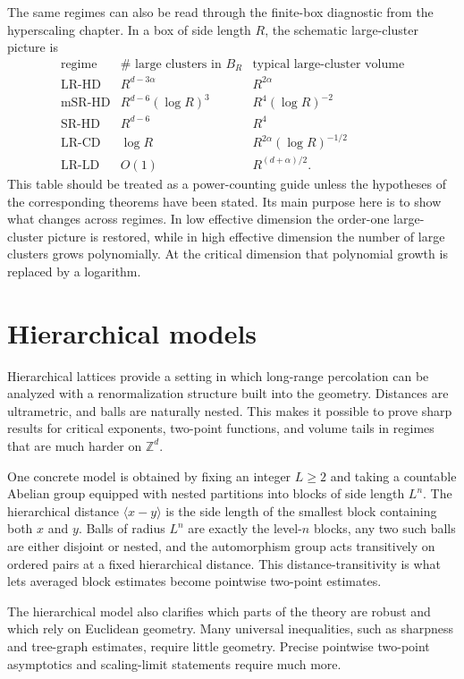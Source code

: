 \documentclass[11pt,reqno]{book}
\numberwithin{equation}{chapter}
\theoremstyle{plain}
\theoremstyle{definition}
\theoremstyle{remark}
\newcommand{\Z}{\mathbb Z}
\newcommand{\1}{\mathbf 1}
\begin{document}
The same regimes can also be read through the finite-box diagnostic from the hyperscaling chapter. In a box of side length $R$, the schematic large-cluster picture is
\[
\begin{array}{c|c|c}
\text{regime}
&
\#\text{ large clusters in }B_R
&
\text{typical large-cluster volume}
\\ \hline
\mathrm{LR\mbox{-}HD}
&
R^{d-3\alpha}
&
R^{2\alpha}
\\
\mathrm{mSR\mbox{-}HD}
&
R^{d-6}(\log R)^3
&
R^4(\log R)^{-2}
\\
\mathrm{SR\mbox{-}HD}
&
R^{d-6}
&
R^4
\\
\mathrm{LR\mbox{-}CD}
&
\log R
&
R^{2\alpha}(\log R)^{-1/2}
\\
\mathrm{LR\mbox{-}LD}
&
O(1)
&
R^{(d+\alpha)/2}.
\end{array}
\]
This table should be treated as a power-counting guide unless the hypotheses of the corresponding theorems have been stated. Its main purpose here is to show what changes across regimes. In low effective dimension the order-one large-cluster picture is restored, while in high effective dimension the number of large clusters grows polynomially. At the critical dimension that polynomial growth is replaced by a logarithm.

\section{Hierarchical models}

Hierarchical lattices provide a setting in which long-range percolation can be analyzed with a renormalization structure built into the geometry. Distances are ultrametric, and balls are naturally nested. This makes it possible to prove sharp results for critical exponents, two-point functions, and volume tails in regimes that are much harder on $\Z^d$.

One concrete model is obtained by fixing an integer $L\geq2$ and taking a countable Abelian group equipped with nested partitions into blocks of side length $L^n$. The hierarchical distance $\langle x-y\rangle$ is the side length of the smallest block containing both $x$ and $y$. Balls of radius $L^n$ are exactly the level-$n$ blocks, any two such balls are either disjoint or nested, and the automorphism group acts transitively on ordered pairs at a fixed hierarchical distance. This distance-transitivity is what lets averaged block estimates become pointwise two-point estimates.

The hierarchical model also clarifies which parts of the theory are robust and which rely on Euclidean geometry. Many universal inequalities, such as sharpness and tree-graph estimates, require little geometry. Precise pointwise two-point asymptotics and scaling-limit statements require much more.
\end{document}
